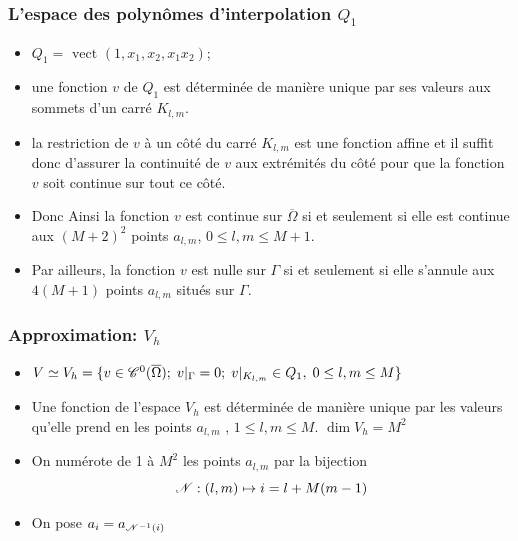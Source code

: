 \documentclass{beamer}
\begin{document}
\begin{frame}
\frametitle{L'espace des polynômes d'interpolation $Q_1$}
\begin{itemize}
\item $Q_1=\mbox{ vect }(1,x_1,x_2,x_1x_2)$;
\item une fonction $v$ de $Q_1$ est déterminée de manière unique par ses valeurs aux sommets d'un carré $K_{l,m}$.
\item la restriction de $v$ à un côté du carré $K_{l,m}$ est une fonction affine et il suffit donc d'assurer la continuité de $v$ aux extrémités du côté pour que la fonction $v$ soit continue sur tout ce côté. 
\item Donc Ainsi la fonction $v$ est continue sur $\overline{\Omega}$ si et seulement si elle est continue aux  $(M+ 2)^2$ points $a_{l,m}$,  $0\leq l,m\leq M+1$.
\item Par ailleurs, la fonction $v$ est nulle sur $\Gamma$ si et seulement si elle s'annule aux $4(M+ 1)$ points $a_{l,m}$ situés sur $\Gamma$.
\end{itemize}


\end{frame}

\begin{frame}
\frametitle{Approximation: $V_h$}
\begin{itemize}
\item $V\simeq V_h = \{ v\in {\cal C}^0(\overline{\Omega});\; v|_{\Gamma} = 0;\; v|_{K_{l,m}} \in Q_1,\; 0\leq l,m\leq M\}$
\item  Une fonction de l'espace $V_h$ est déterminée de manière unique par les valeurs qu'elle prend en les points $a_{l,m}$ , $1\leq l,m\leq M$.  $\dim V_h=M^2$
\item On numérote de 1 à $M^2$ les points $a_{l,m}$ par la bijection
\begin{equation}
{\cal N}: (l,m)\mapsto i=l+M(m-1)
\end{equation}
\begin{center}
\end{center}

 \item On pose $a_i=a_{{\cal N}^{-1}(i)}$
\end{itemize}


\end{frame}
\end{document}
